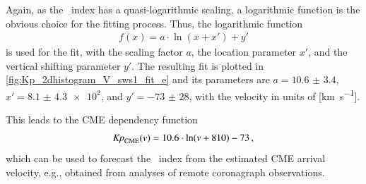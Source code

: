Again, as the \Kp~index has a quasi-logarithmic scaling, a logarithmic function is the obvious choice for the fitting process. Thus, the logarithmic function
\begin{align}
	f(x) = a \cdot \ln\left(x + x'\right) + y'	\label{eq:log_offset_fit_function}
\end{align}
is used for the fit, with the scaling factor $a$, the location parameter $x'$, and the vertical shifting parameter $y'$. The resulting fit is plotted in \autoref{fig:Kp_2dhistogram_V_sws1_fit_e} and its parameters are $a = \num{10.6(34)}$, $x' = \num{8.1(43)e2}$, and $y' = \num{-73(28)}$, with the velocity in units of [\si{\km\per\s}].
\begin{figure}
\end{figure}
This leads to the CME dependency function
\begin{align}
	\text{\textit{Kp}}_\text{CME}(v) = 10.6 \cdot \ln(v + 810) - 73	\,,	\label{eq:kpvsv_CME_dependency_function}
\end{align}
which can be used to forecast the \Kp{}~index from the estimated CME arrival velocity, e.g., obtained from analyses of remote coronagraph observations.


